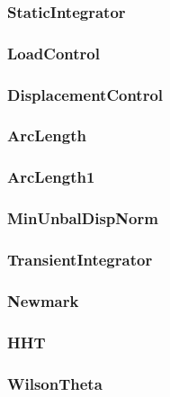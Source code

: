 \documentclass[12pt]{article}
\begin{document}
\pagebreak \subsubsection{{\bf StaticIntegrator}}


\pagebreak \subsubsection{ LoadControl}


\pagebreak \subsubsection{ DisplacementControl}


\pagebreak \subsubsection{ ArcLength}


\pagebreak \subsubsection{ ArcLength1}


\pagebreak \subsubsection{ MinUnbalDispNorm}


\pagebreak \subsubsection{{\bf TransientIntegrator}}


\pagebreak \subsubsection{Newmark}


\pagebreak \subsubsection{HHT}


\pagebreak \subsubsection{WilsonTheta}

\end{document}
